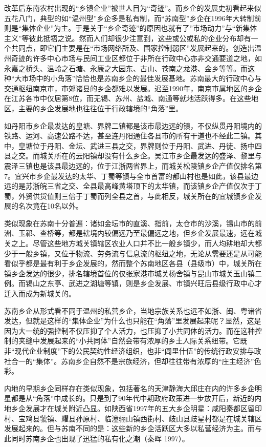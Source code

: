 \documentclass[a4paper,12pt,punct=kaiming]{ctexart}
\begin{document}
改革后东南农村出现的“乡镇企业”被世人目为“奇迹”。而乡企的发展史初看起来似五花八门，典型的如“温州型”乡企多是私有制，而“苏南型”乡企在1996年大转制前则是“集体企业”为主。于是关于“乡企奇迹”的原因也就有了”市场动力”与“新集体主义”等彼此抵牾之说。然而人们却很少注意到，这些或公或私的企业分布却有一个共同点，即它们主要是在“市场网络所及、国家控制弱区”发展起来的。创造出温州奇迹的许多中心市场与民间工业区都位于非所在行政中心亦非交通要道之地，如永嘉之桥头、温岭之石塘、永康之大园东、古山、苍南之龙港、金乡等等。而这种“大市场中的小角落”恰恰也是苏南乡企的最佳发展基地。苏南最大的行政中心与交通枢纽南京市，市郊诸县的乡企都难以发展。迟至1990年，南京市属地区的乡企在江苏各市中仅居第8位，而无锡、苏州、盐城、南通等就地活跃得多。在这些地区，主要的乡企发展地也往往位于行政辖境的“角落”里。

如丹阳市乡企最发达的皇塘、界牌二镇都是该市最边远的镇，不仅纵贯丹阳境内的铁路、运河、高速公路不达，甚至连丹阳通住各县市的所有干道也不经此二镇。其中，皇塘位于丹阳、金坛、武进三县之交，界牌则位于丹阳、武进、丹徒、扬中四县之交。而城关所在的云阳镇却没有什么乡企。吴江市乡企最发达的盛泽、黎里与震泽三镇也是该县最边远的，位于江浙两省界上，而城关松陵镇乡企产值仅排名第7。宜兴市乡企最发达的太华、丁蜀等镇与全市首富的都山村也是如此，该县最边远的是苏浙皖三省之交、全县最高峰黄塔顶下的太华镇，而该镇乡企产值仅次于丁蜀，外贸供货值则三倍于丁蜀而列全县之首，与此相反，城关所在的宜城镇乡企发展的名次竟在10名以外。

类似现象在苏南十分普遍：诸如金坛市的直溪、指前，太仓市的沙溪，锡山市的前洲、玉祁、查桥等，都是辖境内较偏远乃至最偏远之地，但乡企发展最速，远在城关之上。尽管这些地方城关镇辖区农业人口并不比一般乡镇少，而人均耕地却大都少于一般乡镇，又位于物流、劳务流与信息流的枢纽之地，无论从需要还是从可能看似乎都是最有利于乡企发展的，然而整个苏南地区各县（县级市）中，城关所在镇乡企发达的很少，排名辖境首位的仅张家港市城关杨舍镇与昆山市城关玉山镇二例。而锡山之东亭、武进之湖塘等镇，则是乡企发展、市镇兴旺后县级行政中心才迁入而成为新城关的。

苏南乡企从形式看不同于温州的私营乡企，当地宗族关系也远不如浙、闽、粤诸省发达，但就是这样的“集体企业”为什么也只能在“角落”里发展起来呢？显然，这是因为大一统的强控制不仅压抑了个人活力，也压抑了小共同体的活力。而在这种控制的夹缝中发展起来的“小共同体”自然会带有浓厚的乡土人际关系纽带。它既非“现代企业制度”下的公民契约性经济组织，也非“闾里什伍”的传统行政安排与政社合一的“集体”。苏南乡企自然不是宗族经济，但却往往带有浓厚的“庄主经济”色彩。

内地的早期乡企同样存在类似现象，包括著名的天津静海大邱庄在内的许多乡企明星都是从“角落”中成长的。只是到了90年代中期政府政策进一步放开后，新近的内地乡企发展才在城关附近凸显。如陕西省1997年的五大乡企明星：咸阳秦都区留印村、宝鸡县虢镇、耀县孙原村、临潼骊山镇西街村、歧山县歧星村都是在城关辖区发展起来的。但与苏南不同的是：这些新的乡企活跃区大多以私营经济为主。而与此同时苏南乡企也出现了迅猛的私有化之潮（秦晖 1997）。
\end{document}
